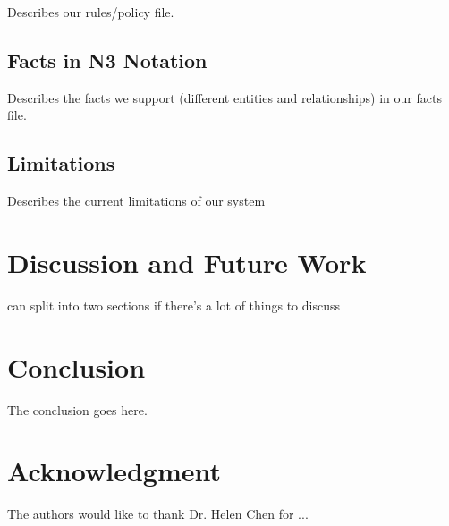 \documentclass[conference]{IEEEtran}
\begin{document}
Describes our rules/policy file. 

\subsection{Facts in N3 Notation}

Describes the facts we support (different entities and relationships) in our facts file.

\subsection{Limitations}

Describes the current limitations of our system

\section{Discussion and Future Work}
\label{discFuture}

can split into two sections if there's a lot of things to discuss


\section{Conclusion}
\label{concl}
The conclusion goes here.






\section*{Acknowledgment}


The authors would like to thank Dr. Helen Chen for ...











\end{document}
